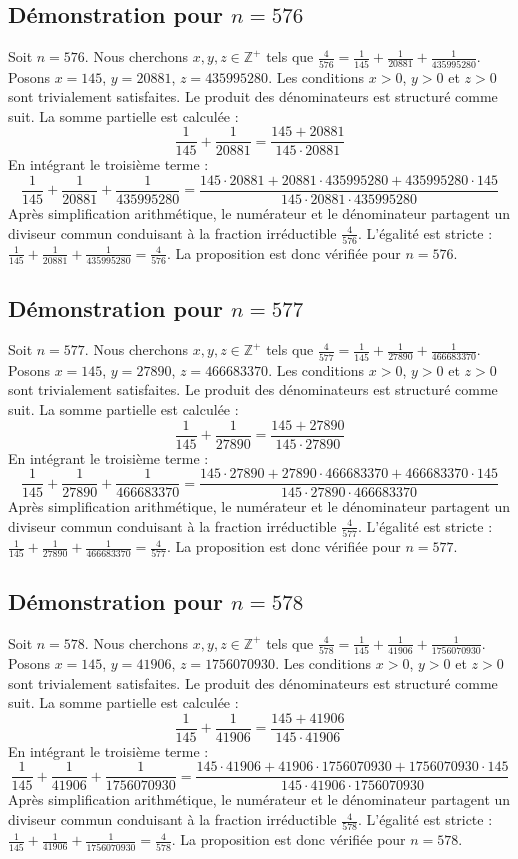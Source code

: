 \documentclass[11pt,a4paper]{article}
\begin{document}
\subsection{Démonstration pour $n = 576$}
Soit $n = 576$. Nous cherchons $x, y, z \in \mathbb{Z}^{+}$ tels que $\frac{4}{576} = \frac{1}{145} + \frac{1}{20881} + \frac{1}{435995280}$.
Posons $x = 145$, $y = 20881$, $z = 435995280$.
Les conditions $x > 0$, $y > 0$ et $z > 0$ sont trivialement satisfaites.
Le produit des dénominateurs est structuré comme suit. La somme partielle est calculée :
$$ \frac{1}{145} + \frac{1}{20881} = \frac{145+20881}{145 \cdot 20881} $$
En intégrant le troisième terme :
$$ \frac{1}{145} + \frac{1}{20881} + \frac{1}{435995280} = \frac{145 \cdot 20881 + 20881 \cdot 435995280 + 435995280 \cdot 145}{145 \cdot 20881 \cdot 435995280} $$
Après simplification arithmétique, le numérateur et le dénominateur partagent un diviseur commun conduisant à la fraction irréductible $\frac{4}{576}$.
L'égalité est stricte : $\frac{1}{145} + \frac{1}{20881} + \frac{1}{435995280} = \frac{4}{576}$.
La proposition est donc vérifiée pour $n = 576$.
\subsection{Démonstration pour $n = 577$}
Soit $n = 577$. Nous cherchons $x, y, z \in \mathbb{Z}^{+}$ tels que $\frac{4}{577} = \frac{1}{145} + \frac{1}{27890} + \frac{1}{466683370}$.
Posons $x = 145$, $y = 27890$, $z = 466683370$.
Les conditions $x > 0$, $y > 0$ et $z > 0$ sont trivialement satisfaites.
Le produit des dénominateurs est structuré comme suit. La somme partielle est calculée :
$$ \frac{1}{145} + \frac{1}{27890} = \frac{145+27890}{145 \cdot 27890} $$
En intégrant le troisième terme :
$$ \frac{1}{145} + \frac{1}{27890} + \frac{1}{466683370} = \frac{145 \cdot 27890 + 27890 \cdot 466683370 + 466683370 \cdot 145}{145 \cdot 27890 \cdot 466683370} $$
Après simplification arithmétique, le numérateur et le dénominateur partagent un diviseur commun conduisant à la fraction irréductible $\frac{4}{577}$.
L'égalité est stricte : $\frac{1}{145} + \frac{1}{27890} + \frac{1}{466683370} = \frac{4}{577}$.
La proposition est donc vérifiée pour $n = 577$.
\subsection{Démonstration pour $n = 578$}
Soit $n = 578$. Nous cherchons $x, y, z \in \mathbb{Z}^{+}$ tels que $\frac{4}{578} = \frac{1}{145} + \frac{1}{41906} + \frac{1}{1756070930}$.
Posons $x = 145$, $y = 41906$, $z = 1756070930$.
Les conditions $x > 0$, $y > 0$ et $z > 0$ sont trivialement satisfaites.
Le produit des dénominateurs est structuré comme suit. La somme partielle est calculée :
$$ \frac{1}{145} + \frac{1}{41906} = \frac{145+41906}{145 \cdot 41906} $$
En intégrant le troisième terme :
$$ \frac{1}{145} + \frac{1}{41906} + \frac{1}{1756070930} = \frac{145 \cdot 41906 + 41906 \cdot 1756070930 + 1756070930 \cdot 145}{145 \cdot 41906 \cdot 1756070930} $$
Après simplification arithmétique, le numérateur et le dénominateur partagent un diviseur commun conduisant à la fraction irréductible $\frac{4}{578}$.
L'égalité est stricte : $\frac{1}{145} + \frac{1}{41906} + \frac{1}{1756070930} = \frac{4}{578}$.
La proposition est donc vérifiée pour $n = 578$.
\end{document}
